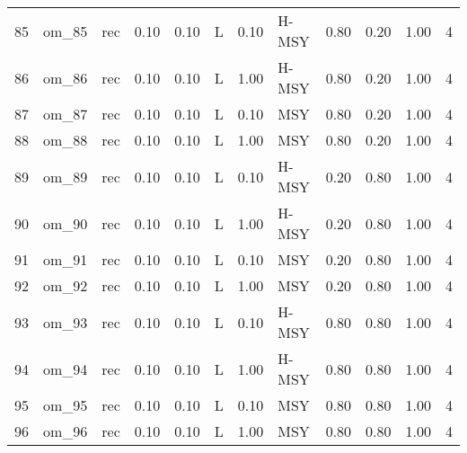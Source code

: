 \begin{table}[ht]
\begin{tabular}{rllrrlrlrrrr}
  85 & om\_85 & rec & 0.10 & 0.10 & L & 0.10 & H-MSY & 0.80 & 0.20 & 1.00 &   4 \\ 
  86 & om\_86 & rec & 0.10 & 0.10 & L & 1.00 & H-MSY & 0.80 & 0.20 & 1.00 &   4 \\ 
  87 & om\_87 & rec & 0.10 & 0.10 & L & 0.10 & MSY & 0.80 & 0.20 & 1.00 &   4 \\ 
  88 & om\_88 & rec & 0.10 & 0.10 & L & 1.00 & MSY & 0.80 & 0.20 & 1.00 &   4 \\ 
  89 & om\_89 & rec & 0.10 & 0.10 & L & 0.10 & H-MSY & 0.20 & 0.80 & 1.00 &   4 \\ 
  90 & om\_90 & rec & 0.10 & 0.10 & L & 1.00 & H-MSY & 0.20 & 0.80 & 1.00 &   4 \\ 
  91 & om\_91 & rec & 0.10 & 0.10 & L & 0.10 & MSY & 0.20 & 0.80 & 1.00 &   4 \\ 
  92 & om\_92 & rec & 0.10 & 0.10 & L & 1.00 & MSY & 0.20 & 0.80 & 1.00 &   4 \\ 
  93 & om\_93 & rec & 0.10 & 0.10 & L & 0.10 & H-MSY & 0.80 & 0.80 & 1.00 &   4 \\ 
  94 & om\_94 & rec & 0.10 & 0.10 & L & 1.00 & H-MSY & 0.80 & 0.80 & 1.00 &   4 \\ 
  95 & om\_95 & rec & 0.10 & 0.10 & L & 0.10 & MSY & 0.80 & 0.80 & 1.00 &   4 \\ 
  96 & om\_96 & rec & 0.10 & 0.10 & L & 1.00 & MSY & 0.80 & 0.80 & 1.00 &   4 \\ 
   \hline
\end{tabular}
\end{table}
